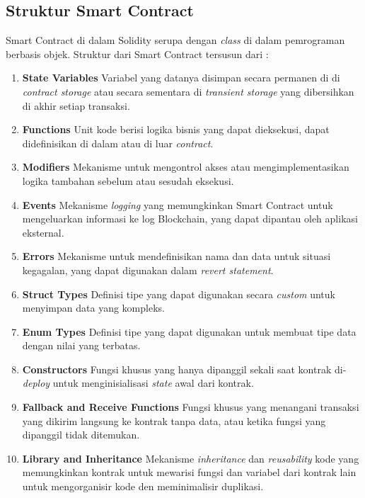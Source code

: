 \subsection{Struktur Smart Contract}
\label{subsec:struktur-smart-contract}

Smart Contract di dalam Solidity serupa dengan \textit{class} di dalam pemrograman berbasis objek. Struktur dari Smart Contract tersusun dari \parencite{solidity_structure}:

\begin{enumerate}
  \item \textbf{State Variables} \newline
  Variabel yang datanya disimpan secara permanen di di \textit{contract storage} atau secara sementara di \textit{transient storage} yang dibersihkan di akhir setiap transaksi.
  \item \textbf{Functions} \newline
  Unit kode berisi logika bisnis yang dapat dieksekusi, dapat didefinisikan di dalam atau di luar \textit{contract}.
  \item \textbf{Modifiers} \newline
  Mekanisme untuk mengontrol akses atau mengimplementasikan logika tambahan sebelum atau sesudah eksekusi.
  \item \textbf{Events} \newline
  Mekanisme \textit{logging} yang memungkinkan Smart Contract untuk mengeluarkan informasi ke log Blockchain, yang dapat dipantau oleh aplikasi eksternal.
  \item \textbf{Errors} \newline
  Mekanisme untuk mendefinisikan nama dan data untuk situasi kegagalan, yang dapat digunakan dalam \textit{revert statement}.
  \item \textbf{Struct Types} \newline
  Definisi tipe yang dapat digunakan secara \textit{custom} untuk menyimpan data yang kompleks.
  \item \textbf{Enum Types} \newline
  Definisi tipe yang dapat digunakan untuk membuat tipe data dengan nilai yang terbatas.
  \item \textbf{Constructors} \newline
  Fungsi khusus yang hanya dipanggil sekali saat kontrak di-\textit{deploy} untuk menginisialisasi \textit{state} awal dari kontrak.
  \item \textbf{Fallback and Receive Functions} \newline
  Fungsi khusus yang menangani transaksi yang dikirim langsung ke kontrak tanpa data, atau ketika fungsi yang dipanggil tidak ditemukan.
  \item \textbf{Library and Inheritance} \newline
  Mekanisme \textit{inheritance} dan \textit{reusability} kode yang memungkinkan kontrak untuk mewarisi fungsi dan variabel dari kontrak lain untuk mengorganisir kode den meminimalisir duplikasi.
\end{enumerate}
